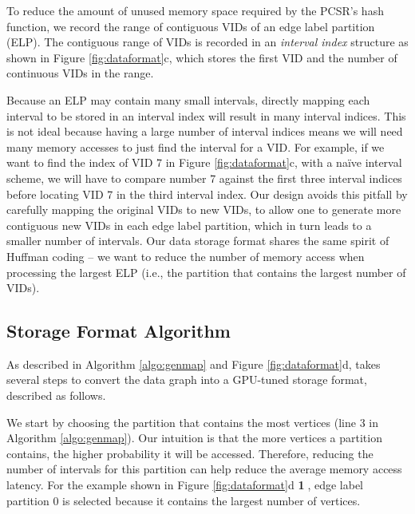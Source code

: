 To reduce the amount of unused memory space required by the PCSR's hash function, we record the range of contiguous VIDs of an edge label
partition (ELP). The contiguous range of VIDs is recorded in an \emph{interval index} structure as shown in Figure \ref{fig:dataformat}c,
which stores the first VID and the number of continuous VIDs in the range.

Because an ELP may contain many small intervals, directly mapping each interval to be stored in an interval index will result in many
interval indices. This is not ideal because having a large number of interval indices means we will need many memory accesses to just find
the interval for a VID. For example, if we want to find the index of VID 7 in Figure \ref{fig:dataformat}c, with a naïve interval scheme,
we will have to compare number 7 against the first three interval indices before locating VID 7 in the third interval index. Our design
avoids this pitfall by carefully mapping the original VIDs to new VIDs, to allow one to generate more contiguous new VIDs in each edge
label partition, which in turn leads to a smaller number of intervals. Our data storage format shares the same spirit of Huffman coding \cite{Moffat2019Huffman} – we want to reduce the number of memory access when processing the largest ELP (i.e., the partition that contains the largest number of VIDs).

\subsection{\SystemName Storage Format Algorithm}

 As described in Algorithm \ref{algo:genmap} and Figure \ref{fig:dataformat}d, \SystemName takes several steps to convert the data graph into a GPU-tuned storage format, described as follows.

 We start by choosing the partition that contains the most vertices (line 3 in Algorithm
\ref{algo:genmap}). Our intuition is that the more vertices a partition contains, the higher probability it will be accessed. Therefore,
reducing the number of intervals for this partition can help reduce the average memory access latency. For the example shown in Figure
\ref{fig:dataformat}d \textbf{\textcircled{1}}, edge label partition 0 is selected because it contains the largest number of vertices.

